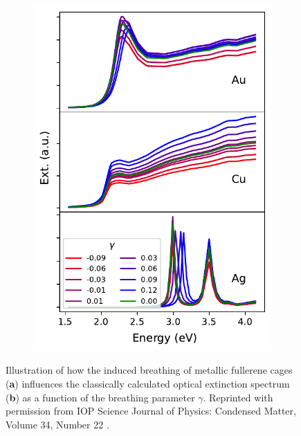 \begin{figure}
\begin{subfigure}[b]{0.35\textwidth}
    \includegraphics[width=\textwidth]{figures/LM/GDM/ClassicalSpectra_Smol.pdf}
    \caption{}
    \label{Fig:Breathe_Spectra}
    \end{subfigure}
    \caption{Illustration of how the induced breathing of metallic fullerene cages (\textbf{a}) influences the classically calculated optical extinction spectrum (\textbf{b}) as a function of the breathing parameter $\gamma$. Reprinted with permission from IOP Science Journal of Physics: Condensed Matter, Volume 34, Number 22 \cite{Wei}.}
    \label{Fig:Breathe}
\end{figure}

